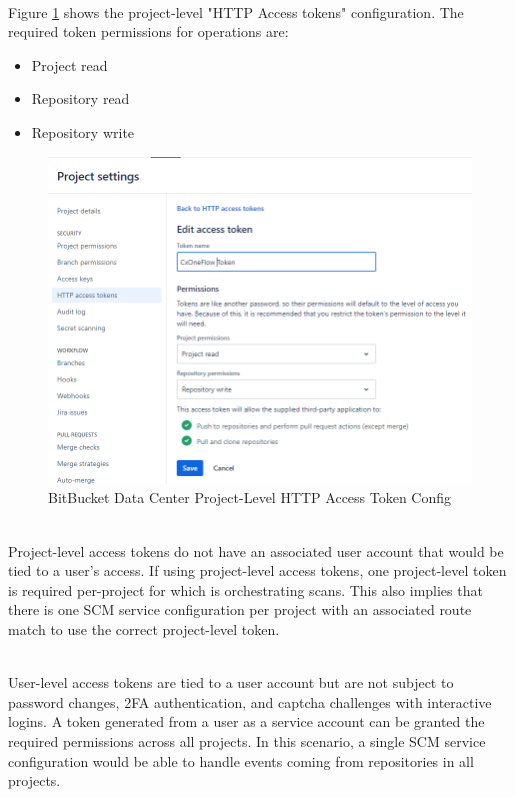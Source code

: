 \noindent\\Figure \ref{fig:bbdc-token-config} shows the project-level "HTTP Access tokens" configuration.  The required
token permissions for \cxoneflow operations are:

\begin{itemize}
    \item Project read
    \item Repository read
    \item Repository write
\end{itemize}


\begin{figure}[ht]
    \includegraphics[width=\textwidth]{graphics/bbdc-token-config.png}
    \caption{BitBucket Data Center Project-Level HTTP Access Token Config}
    \label{fig:bbdc-token-config}
\end{figure}

\noindent\\Project-level access tokens do not have an associated user account that would be tied to
a user's access.  If using project-level access tokens, one project-level token is required per-project
for which \cxoneflow is orchestrating scans.  This also implies that there is one SCM service 
configuration per project with an associated route match to use the correct project-level token.

\noindent\\User-level access tokens are tied to a user account but are not subject to password
changes, 2FA authentication, and captcha challenges with interactive logins.  A token generated
from a user as a service account can be granted the required permissions across all projects.
In this scenario, a single SCM service configuration would be able to handle events coming from
repositories in all projects.


